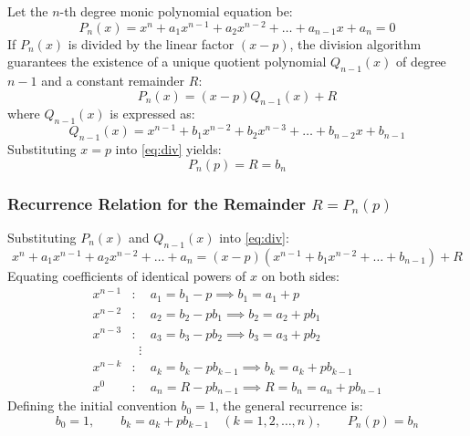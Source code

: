 \documentclass[11pt,a4paper]{article}
\begin{document}
Let the $n$-th degree monic polynomial equation be:
\begin{equation}
    P_n(x) = x^n + a_1 x^{n-1} + a_2 x^{n-2} + \dots + a_{n-1} x + a_n = 0 \label{eq:poly}
\end{equation}
If $P_n(x)$ is divided by the linear factor $(x - p)$, the division algorithm guarantees the existence of a unique quotient polynomial $Q_{n-1}(x)$ of degree $n-1$ and a constant remainder $R$:
\begin{equation}
    P_n(x) = (x - p) Q_{n-1}(x) + R \label{eq:div}
\end{equation}
where $Q_{n-1}(x)$ is expressed as:
\begin{equation}
    Q_{n-1}(x) = x^{n-1} + b_1 x^{n-2} + b_2 x^{n-3} + \dots + b_{n-2} x + b_{n-1}
\end{equation}
Substituting $x = p$ into \eqref{eq:div} yields:
\begin{equation}
    P_n(p) = R = b_n
\end{equation}

\subsubsection{Recurrence Relation for the Remainder \texorpdfstring{$R = P_n(p)$}{R = P_n(p)}}
Substituting $P_n(x)$ and $Q_{n-1}(x)$ into \eqref{eq:div}:
\begin{equation}
    x^n + a_1 x^{n-1} + a_2 x^{n-2} + \dots + a_n = (x - p)\left(x^{n-1} + b_1 x^{n-2} + \dots + b_{n-1}\right) + R
\end{equation}
Equating coefficients of identical powers of $x$ on both sides:
\begin{align*}
    x^{n-1}&: \quad a_1 = b_1 - p \implies b_1 = a_1 + p \\
    x^{n-2}&: \quad a_2 = b_2 - p b_1 \implies b_2 = a_2 + p b_1 \\
    x^{n-3}&: \quad a_3 = b_3 - p b_2 \implies b_3 = a_3 + p b_2 \\
    &\;\;\vdots \\
    x^{n-k}&: \quad a_k = b_k - p b_{k-1} \implies b_k = a_k + p b_{k-1} \\
    x^0&: \quad a_n = R - p b_{n-1} \implies R = b_n = a_n + p b_{n-1}
\end{align*}
Defining the initial convention $b_0 = 1$, the general recurrence is:
\begin{equation}
    \boxed{b_0 = 1, \qquad b_k = a_k + p b_{k-1} \quad (k = 1, 2, \dots, n), \qquad P_n(p) = b_n}
\end{equation}
\end{document}
